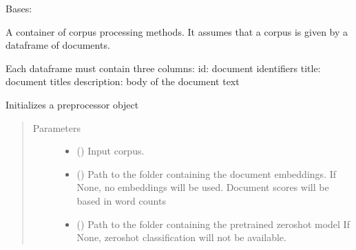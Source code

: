 \documentclass[letterpaper,10pt,english]{sphinxmanual}
\begin{document}
\begin{fulllineitems}
\label{\detokenize{dc_preprocessor:src.domain_classifier.preprocessor.CorpusDFProcessor}}
\sphinxAtStartPar
Bases: 

\sphinxAtStartPar
A container of corpus processing methods.
It assumes that a corpus is given by a dataframe of documents.

\sphinxAtStartPar
Each dataframe must contain three columns:
id: document identifiers
title: document titles
description: body of the document text

\begin{fulllineitems}
\label{\detokenize{dc_preprocessor:src.domain_classifier.preprocessor.CorpusDFProcessor.__init__}}
\sphinxAtStartPar
Initializes a preprocessor object
\begin{quote}\begin{description}
\item[{Parameters}] \leavevmode\begin{itemize}
\item {} 
\sphinxAtStartPar
{} () \textendash{} Input corpus.

\item {} 
\sphinxAtStartPar
{} () \textendash{} Path to the folder containing the document embeddings.
If None, no embeddings will be used. Document scores will be based
in word counts

\item {} 
\sphinxAtStartPar
{} () \textendash{} Path to the folder containing the pretrained zero\sphinxhyphen{}shot model
If None, zero\sphinxhyphen{}shot classification will not be available.


\end{itemize}
\end{description}
\end{quote}
\end{fulllineitems}
\end{fulllineitems}
\end{document}
